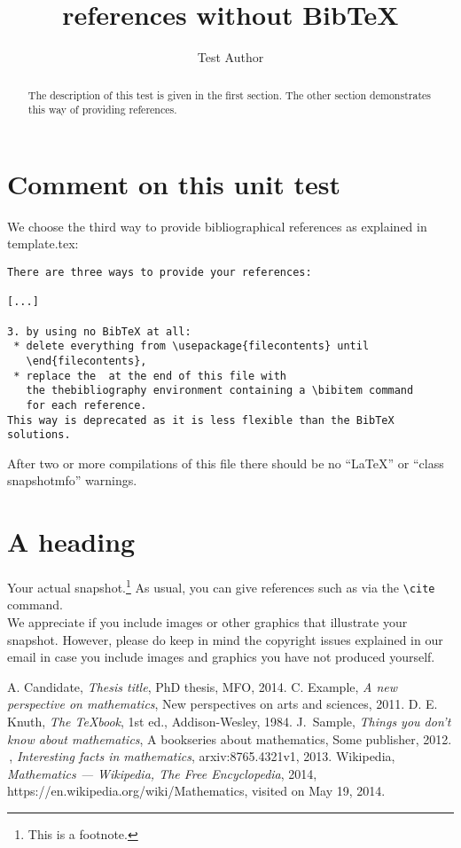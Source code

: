 \documentclass{snapshotmfo}
\author{Test Author}
\title{references without BibTeX}
\begin{document}

\begin{abstract}
The description of this test is given in the first section. The other section demonstrates this way of providing references.
\end{abstract}

\section{Comment on this unit test}
We choose the third way to provide bibliographical references as explained in template.tex:
\begin{verbatim}
There are three ways to provide your references:

[...]

3. by using no BibTeX at all:
 * delete everything from \usepackage{filecontents} until
   \end{filecontents},
 * replace the  at the end of this file with
   the thebibliography environment containing a \bibitem command
   for each reference.
This way is deprecated as it is less flexible than the BibTeX
solutions.
\end{verbatim}

After two or more compilations of this file there should be no ``LaTeX'' or ``class snapshotmfo'' warnings.

\section{A heading}
Your actual snapshot.\footnote{This is a footnote.} As usual, you can give references such as \cite{knuth1984texbook, wikiMath, sample13, sample12, sample11, sample14} via the \verb+\cite+ command.\\

We appreciate if you include images or other graphics that illustrate your snapshot. However, please do keep in mind the copyright issues explained in our email in case you include images and graphics you have not produced yourself.

\begin{thebibliography}{}
A. Candidate, {\slshape Thesis title}, PhD thesis, MFO, 2014.
C. Example, {\slshape A new perspective on mathematics}, New perspectives on arts and sciences, 2011.
D. E. Knuth, {\slshape The TeXbook}, 1st ed., Addison-Wesley, 1984.
J.\ Sample, {\slshape Things you don't know about mathematics}, A bookseries about mathematics, Some publisher, 2012.
\underline{\hphantom{J.\ Sam}}\,, {\slshape Interesting facts in mathematics}, arxiv:8765.4321v1, 2013.
Wikipedia, {\slshape Mathematics --- {W}ikipedia{,} The Free Encyclopedia}, 2014, https://en.wikipedia.org/wiki/Mathematics, visited on May 19, 2014.
\end{thebibliography}
\end{document}
